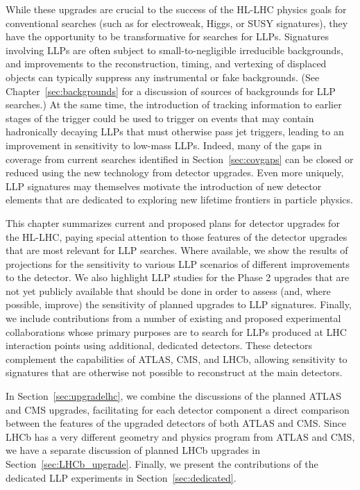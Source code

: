 While these upgrades are crucial to the success of the HL-LHC physics goals for conventional searches (such as for electroweak, Higgs, or SUSY signatures), they have the opportunity to be transformative for searches for LLPs. Signatures involving LLPs are often subject to small-to-negligible irreducible backgrounds, and improvements to the reconstruction, timing, and vertexing of displaced objects can typically suppress any instrumental or fake backgrounds. (See Chapter~\ref{sec:backgrounds} for a discussion of sources of backgrounds for LLP searches.) At the same time, the introduction of tracking information to earlier stages of the trigger could be used to trigger on events that may contain hadronically decaying LLPs that must otherwise pass jet triggers, leading to an improvement in sensitivity to low-mass LLPs. Indeed, many of the gaps in coverage from current searches identified in Section~\ref{sec:covgaps} can be closed or reduced using the new technology from detector upgrades. Even more uniquely, LLP signatures may themselves motivate the introduction of new detector elements that are dedicated to exploring new lifetime frontiers in particle physics.

This chapter summarizes current and proposed plans for detector upgrades for the HL-LHC, paying special attention to those features of the detector upgrades that are most relevant for LLP searches. Where available, we show the results of projections for the sensitivity to various LLP scenarios of different improvements to the detector. We also highlight LLP studies for the Phase 2 upgrades that are not yet publicly available that should be done in order to assess (and, where possible, improve) the sensitivity of planned upgrades to LLP signatures. Finally, we include contributions from a number of existing and proposed experimental collaborations whose primary purposes are to search for LLPs produced at LHC interaction points using additional, dedicated detectors. These detectors complement the capabilities of ATLAS, CMS, and LHCb, allowing sensitivity to signatures that are otherwise not possible to reconstruct at the main detectors.

In Section~\ref{sec:upgradelhc}, we combine the discussions of the planned ATLAS and CMS upgrades, facilitating for each detector component a direct comparison between the features of the upgraded detectors of both ATLAS and CMS. Since LHCb has a very different geometry and physics program from ATLAS and CMS, we have a separate discussion of planned LHCb upgrades in Section~\ref{sec:LHCb_upgrade}. Finally, we present the contributions of the dedicated LLP experiments in Section~\ref{sec:dedicated}.





